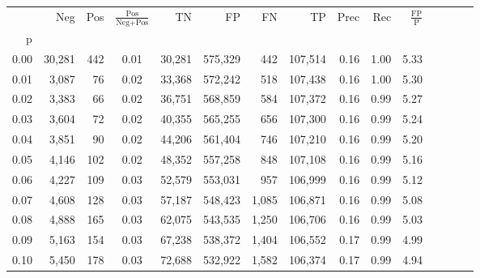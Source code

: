 \begin{tabular}{rrrcrrrrrrrrrrr}
\toprule
{} &     Neg &    Pos & $\frac{\text{Pos}}{\text{Neg}+\text{Pos}}$ &       TN &       FP &       FN &       TP &  Prec &   Rec & $\frac{\text{FP}}{\text{P}}$ \\
p    &         &        &                                            &          &          &          &          &       &       &                              \\
\midrule
0.00 &  30,281 &    442 &                                       0.01 &   30,281 &  575,329 &      442 &  107,514 &  0.16 &  1.00 &                         5.33 \\
0.01 &   3,087 &     76 &                                       0.02 &   33,368 &  572,242 &      518 &  107,438 &  0.16 &  1.00 &                         5.30 \\
0.02 &   3,383 &     66 &                                       0.02 &   36,751 &  568,859 &      584 &  107,372 &  0.16 &  0.99 &                         5.27 \\
0.03 &   3,604 &     72 &                                       0.02 &   40,355 &  565,255 &      656 &  107,300 &  0.16 &  0.99 &                         5.24 \\
0.04 &   3,851 &     90 &                                       0.02 &   44,206 &  561,404 &      746 &  107,210 &  0.16 &  0.99 &                         5.20 \\
0.05 &   4,146 &    102 &                                       0.02 &   48,352 &  557,258 &      848 &  107,108 &  0.16 &  0.99 &                         5.16 \\
0.06 &   4,227 &    109 &                                       0.03 &   52,579 &  553,031 &      957 &  106,999 &  0.16 &  0.99 &                         5.12 \\
0.07 &   4,608 &    128 &                                       0.03 &   57,187 &  548,423 &    1,085 &  106,871 &  0.16 &  0.99 &                         5.08 \\
0.08 &   4,888 &    165 &                                       0.03 &   62,075 &  543,535 &    1,250 &  106,706 &  0.16 &  0.99 &                         5.03 \\
0.09 &   5,163 &    154 &                                       0.03 &   67,238 &  538,372 &    1,404 &  106,552 &  0.17 &  0.99 &                         4.99 \\
0.10 &   5,450 &    178 &                                       0.03 &   72,688 &  532,922 &    1,582 &  106,374 &  0.17 &  0.99 &                         4.94 \\

\end{tabular}
